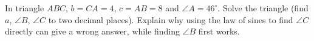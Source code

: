 In triangle $ABC$, $b=CA=4$, $c=AB=8$ and $\angle A=46^\circ$. Solve the triangle (find $a$, $\angle B$, $\angle C$ to two decimal places). Explain why using the law of sines to find $\angle C$ directly can give a wrong answer, while finding $\angle B$ first works.
